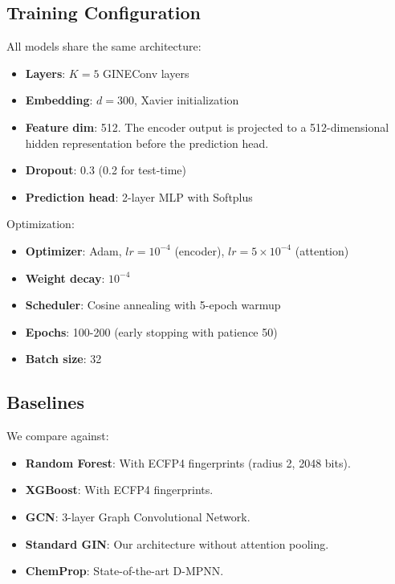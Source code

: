 \documentclass[conference]{IEEEtran}
\begin{document}
\subsection{Training Configuration}

All models share the same architecture:
\begin{itemize}
    \item \textbf{Layers}: $K = 5$ GINEConv layers
    \item \textbf{Embedding}: $d = 300$, Xavier initialization
    \item \textbf{Feature dim}: 512. The encoder output is projected to a 512-dimensional hidden representation before the prediction head.
    \item \textbf{Dropout}: 0.3 (0.2 for test-time)
    \item \textbf{Prediction head}: 2-layer MLP with Softplus
\end{itemize}

Optimization:
\begin{itemize}
    \item \textbf{Optimizer}: Adam, $lr = 10^{-4}$ (encoder), $lr = 5 \times 10^{-4}$ (attention)
    \item \textbf{Weight decay}: $10^{-4}$
    \item \textbf{Scheduler}: Cosine annealing with 5-epoch warmup
    \item \textbf{Epochs}: 100-200 (early stopping with patience 50)
    \item \textbf{Batch size}: 32
\end{itemize}

\subsection{Baselines}

We compare against:
\begin{itemize}
    \item \textbf{Random Forest}: With ECFP4 fingerprints (radius 2, 2048 bits).
    \item \textbf{XGBoost}: With ECFP4 fingerprints.
    \item \textbf{GCN}: 3-layer Graph Convolutional Network.
    \item \textbf{Standard GIN}: Our architecture without attention pooling.
    \item \textbf{ChemProp}: State-of-the-art D-MPNN.
\end{itemize}

\end{document}
